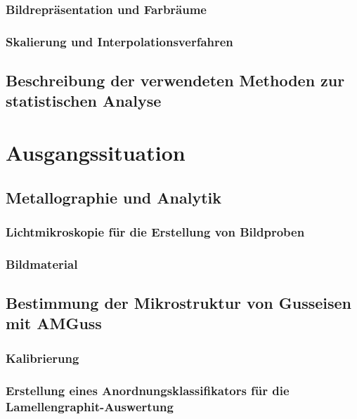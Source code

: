 \documentclass[
fontsize=10pt, 
listof = totoc,
parskip = half	
]{report}
\begin{document}
\subsection{Bildrepräsentation und Farbräume}
\label{Bildrep}

\subsection{Skalierung und Interpolationsverfahren}
\label{subsec:SkalierungUndInterpolation}

\section{Beschreibung der verwendeten Methoden zur statistischen Analyse}
\label{sec:MethodenStatAnalyse}



\chapter{Ausgangssituation}
\label{ch:Ausgangssituation}

\section{Metallographie und Analytik}
\label{sec:MetallographieAnalytik}

\subsection{Lichtmikroskopie für die Erstellung von Bildproben}
\label{subsec:Lichtmikroskopie}

\subsection{Bildmaterial}
\label{subsec:Bildmaterial}

\section{Bestimmung der Mikrostruktur von Gusseisen mit AMGuss}
\label{sec:BestimmungMikrostrukturAMGuss}

\subsection{Kalibrierung}
\label{subsec:Kalibrierung}

\subsection{Erstellung eines Anordnungsklassifikators für die Lamellengraphit-Auswertung}
\label{subsec: Erstellung AnordnungsklassifAMGuss}
\end{document}
